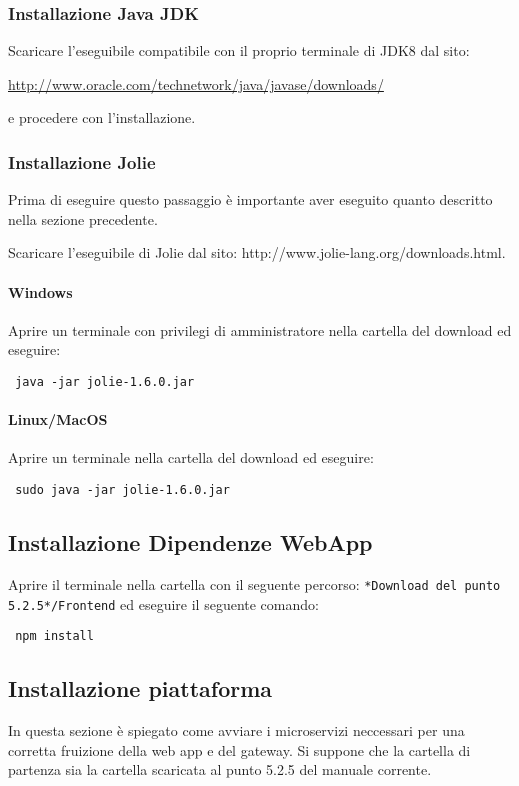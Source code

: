 \subsubsection{Installazione Java JDK}
Scaricare l’eseguibile compatibile con il proprio terminale di JDK8 dal sito:
	\begin{center}
		 \url{http://www.oracle.com/technetwork/java/javase/downloads/} 
	 \end{center}
e procedere con l’installazione.

\subsubsection{Installazione Jolie}
Prima di eseguire questo passaggio è importante aver eseguito quanto descritto nella sezione precedente.

Scaricare l’eseguibile di Jolie dal sito: http://www.jolie-lang.org/downloads.html. 
\paragraph{Windows}
Aprire un terminale con privilegi di amministratore nella cartella del download ed eseguire:
	\begin{center}
	 \verb| java -jar jolie-1.6.0.jar|
	\end{center}
\paragraph{Linux/MacOS}
Aprire un terminale nella cartella del download ed eseguire:
	\begin{center}
	 \verb| sudo java -jar jolie-1.6.0.jar|
	\end{center}
\subsection{Installazione Dipendenze WebApp}
Aprire il terminale nella cartella con il seguente percorso: \verb|*Download del punto 5.2.5*/Frontend| ed eseguire il seguente comando:
	\begin{center}
	\verb| npm install|
\end{center}


\subsection{Installazione piattaforma}
In questa sezione è spiegato come avviare i microservizi neccessari per una corretta fruizione della web app e del gateway. Si suppone che la cartella di partenza sia la cartella scaricata al punto 5.2.5 del manuale corrente.
